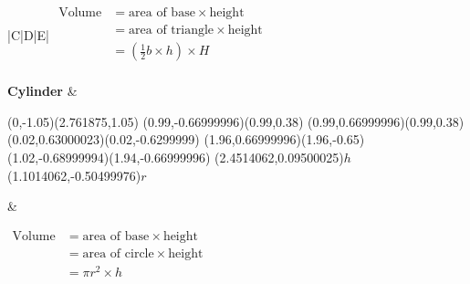 \begin{table*}[h]
\begin{tabular}{|C|D|E|}
$\begin{aligned}
\mbox{Volume} &= \mbox{area of base} \times \mbox{height} \\
              &= \mbox{area of triangle} \times \mbox{height} \\
              &= \left(\frac{1}{2}b\times h\right) \times H \\
\end{aligned}$  \\ \hline

\textbf{Cylinder} &
\begin{center}
\scalebox{0.8} %
{
\begin{pspicture}(0,-1.05)(2.761875,1.05)
\psellipse[linewidth=0.04,dimen=outer](0.99,-0.66999996)(0.99,0.38)
\psellipse[linewidth=0.04,dimen=outer](0.99,0.66999996)(0.99,0.38)
\psline[linewidth=0.04cm](0.02,0.63000023)(0.02,-0.6299999)
\psline[linewidth=0.04cm](1.96,0.66999996)(1.96,-0.65)
\psline[linewidth=0.04cm,linestyle=dashed,dash=0.16cm 0.16cm](1.02,-0.68999994)(1.94,-0.66999996)
\rput(2.4514062,0.09500025){$h$}
\rput(1.1014062,-0.50499976){$r$}
\end{pspicture} 
}
\end{center}
&

$\begin{aligned}
\mbox{Volume} &= \mbox{area of base} \times \mbox{height} \\
              &= \mbox{area of circle} \times \mbox{height} \\
              &= \pi r^2 \times h \\
\end{aligned}$  \\ \hline



\end{tabular}
\end{table*}



